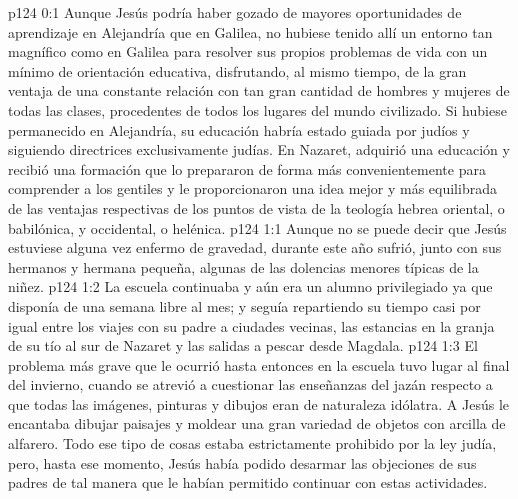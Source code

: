 \author{Comisión de seres intermedios}
\vs p124 0:1 Aunque Jesús podría haber gozado de mayores oportunidades de aprendizaje en Alejandría que en Galilea, no hubiese tenido allí un entorno tan magnífico como en Galilea para resolver sus propios problemas de vida con un mínimo de orientación educativa, disfrutando, al mismo tiempo, de la gran ventaja de una constante relación con tan gran cantidad de hombres y mujeres de todas las clases, procedentes de todos los lugares del mundo civilizado. Si hubiese permanecido en Alejandría, su educación habría estado guiada por judíos y siguiendo directrices exclusivamente judías. En Nazaret, adquirió una educación y recibió una formación que lo prepararon de forma más convenientemente para comprender a los gentiles y le proporcionaron una idea mejor y más equilibrada de las ventajas respectivas de los puntos de vista de la teología hebrea oriental, o babilónica, y occidental, o helénica.
\vs p124 1:1 Aunque no se puede decir que Jesús estuviese alguna vez enfermo de gravedad, durante este año sufrió, junto con sus hermanos y hermana pequeña, algunas de las dolencias menores típicas de la niñez.
\vs p124 1:2 La escuela continuaba y aún era un alumno privilegiado ya que disponía de una semana libre al mes; y seguía repartiendo su tiempo casi por igual entre los viajes con su padre a ciudades vecinas, las estancias en la granja de su tío al sur de Nazaret y las salidas a pescar desde Magdala.
\vs p124 1:3 \pc El problema más grave que le ocurrió hasta entonces en la escuela tuvo lugar al final del invierno, cuando se atrevió a cuestionar las enseñanzas del jazán respecto a que todas las imágenes, pinturas y dibujos eran de naturaleza idólatra. A Jesús le encantaba dibujar paisajes y moldear una gran variedad de objetos con arcilla de alfarero. Todo ese tipo de cosas estaba estrictamente prohibido por la ley judía, pero, hasta ese momento, Jesús había podido desarmar las objeciones de sus padres de tal manera que le habían permitido continuar con estas actividades.
